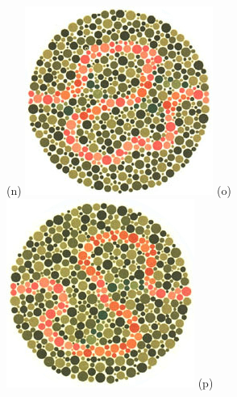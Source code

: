 \documentclass[	12pt, Times, openright, twoside, a4paper, english, brazil]{abntex2}
\begin{document}
\begin{apendicesenv}
\begin{figure}[!htb]
(n)
\endminipage\hfill
{}
\centering
{\includegraphics[width=\linewidth]{ishihara-fuga/plate36.jpg}}
(o)
\endminipage\hfill
{}
\centering
{\includegraphics[width=\linewidth]{ishihara-fuga/plate37.jpg}}
(p)
\endminipage\hfill



\end{figure}
\end{apendicesenv}
\end{document}
